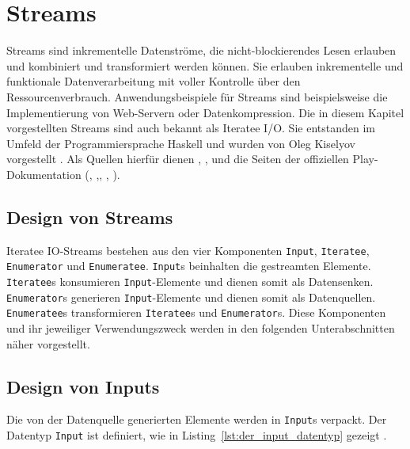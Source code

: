 

\section{Streams} %
\label{sec:streams}

Streams sind inkrementelle Datenströme, die nicht-blockierendes Lesen erlauben und kombiniert und transformiert werden können.
Sie erlauben inkrementelle und funktionale Datenverarbeitung mit voller Kontrolle über den Ressourcenverbrauch.
Anwendungsbeispiele für Streams sind beispielsweise die Implementierung von Web-Servern oder Datenkompression.
Die in diesem Kapitel vorgestellten Streams sind auch bekannt als Iteratee I/O.
Sie entstanden im Umfeld der Programmiersprache Haskell und wurden von Oleg Kiselyov vorgestellt \cite[vgl.][S.~19]{monad_reader}.
Als Quellen hierfür dienen \citealt{kiselyov2012}, \citealt{iteratee_io}, \citealt{monad_reader} und die Seiten der offiziellen Play-Dokumentation (\citealt{iteratees}, \citealt{enumerators},, \citealt{enumeratees}, \citealt{play_api_documentation}).


\subsection{Design von Streams} %
\label{sub:design}

Iteratee IO-Streams bestehen aus den vier Komponenten \lstinline|Input|, \lstinline|Iteratee|, \lstinline|Enumerator| und \lstinline|Enumeratee|.
\lstinline|Input|s beinhalten die gestreamten Elemente.
\lstinline|Iteratee|s konsumieren \lstinline|Input|-Elemente und dienen somit als Datensenken.
\lstinline|Enumerator|s generieren \lstinline|Input|-Elemente und dienen somit als Datenquellen.
\lstinline|Enumeratee|s transformieren \lstinline|Iteratee|s und \lstinline|Enumerator|s.
Diese Komponenten und ihr jeweiliger Verwendungszweck werden in den folgenden Unterabschnitten näher vorgestellt.



\subsection{Design von Inputs} %
\label{sub:design_inputs}

Die von der Datenquelle generierten Elemente werden in \lstinline|Input|s verpackt.
Der Datentyp \lstinline|Input| ist definiert, wie in Listing~\ref{lst:der_input_datentyp} gezeigt \cite[vgl.][Z.~239]{play_iteratee_source_code}.

